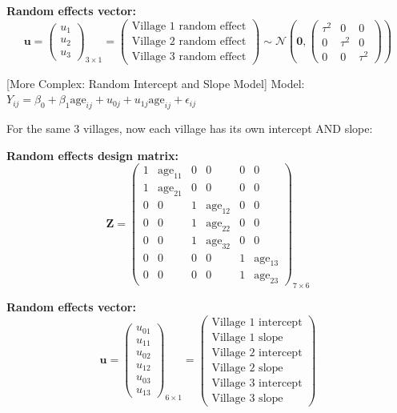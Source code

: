 \documentclass{article}
\begin{document}
\textbf{Random effects vector:}
\begin{equation}
\mathbf{u} = \begin{pmatrix}
u_1 \\ u_2 \\ u_3
\end{pmatrix}_{3 \times 1}
= \begin{pmatrix}
\text{Village 1 random effect} \\
\text{Village 2 random effect} \\
\text{Village 3 random effect}
\end{pmatrix}
\sim \mathcal{N}\left(\mathbf{0}, \begin{pmatrix}
\tau^2 & 0 & 0 \\
0 & \tau^2 & 0 \\
0 & 0 & \tau^2
\end{pmatrix}\right)
\end{equation}


[More Complex: Random Intercept and Slope Model]
Model: $Y_{ij} = \beta_0 + \beta_1 \text{age}_{ij} + u_{0j} + u_{1j} \text{age}_{ij} + \epsilon_{ij}$

For the same 3 villages, now each village has its own intercept AND slope:

\textbf{Random effects design matrix:}
\begin{equation}
\mathbf{Z} = \begin{pmatrix}
1 & \text{age}_{11} & 0 & 0 & 0 & 0 \\
1 & \text{age}_{21} & 0 & 0 & 0 & 0 \\
\hline
0 & 0 & 1 & \text{age}_{12} & 0 & 0 \\
0 & 0 & 1 & \text{age}_{22} & 0 & 0 \\
0 & 0 & 1 & \text{age}_{32} & 0 & 0 \\
\hline
0 & 0 & 0 & 0 & 1 & \text{age}_{13} \\
0 & 0 & 0 & 0 & 1 & \text{age}_{23}
\end{pmatrix}_{7 \times 6}
\end{equation}

\textbf{Random effects vector:}
\begin{equation}
\mathbf{u} = \begin{pmatrix}
u_{01} \\ u_{11} \\ \hline
u_{02} \\ u_{12} \\ \hline
u_{03} \\ u_{13}
\end{pmatrix}_{6 \times 1}
= \begin{pmatrix}
\text{Village 1 intercept} \\
\text{Village 1 slope} \\
\hline
\text{Village 2 intercept} \\
\text{Village 2 slope} \\
\hline
\text{Village 3 intercept} \\
\text{Village 3 slope}
\end{pmatrix}
\end{equation}
\end{document}
